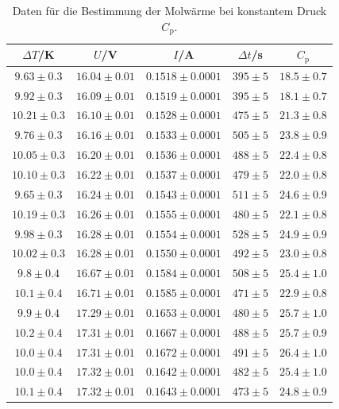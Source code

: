 \begin{table}
  \centering
  \caption{Daten für die Bestimmung der Molwärme bei konstantem Druck $C_\mathrm{p}$.}
  \label{tab:tab1}
  \begin{tabular}{c c c c c}
    \toprule
		$\Delta T$/K & $U$/V & $I$/A & $\Delta t$/s & $C_\mathrm{p}$ \\
    \midrule
    $9.63\pm0.3$ & $16.04\pm0.01$ & $0.1518\pm0.0001$ & $395\pm5$ & $18.5\pm0.7$ \\
    $9.92\pm0.3$ & $16.09\pm0.01$ & $0.1519\pm0.0001$ & $395\pm5$ & $18.1\pm0.7$ \\
    $10.21\pm0.3$ & $16.10\pm0.01$ & $0.1528\pm0.0001$ & $475\pm5$ & $21.3\pm0.8$ \\
    $9.76\pm0.3$ & $16.16\pm0.01$ & $0.1533\pm0.0001$ & $505\pm5$ & $23.8\pm0.9$ \\
    $10.05\pm0.3$ & $16.20\pm0.01$ & $0.1536\pm0.0001$ & $488\pm5$ & $22.4\pm0.8$ \\
    $10.10\pm0.3$ & $16.22\pm0.01$ & $0.1537\pm0.0001$ & $479\pm5$ & $22.0\pm0.8$ \\
    $9.65\pm0.3$ & $16.24\pm0.01$ & $0.1543\pm0.0001$ & $511\pm5$ & $24.6\pm0.9$ \\
    $10.19\pm0.3$ & $16.26\pm0.01$ & $0.1555\pm0.0001$ & $480\pm5$ & $22.1\pm0.8$ \\
    $9.98\pm0.3$ & $16.28\pm0.01$ & $0.1554\pm0.0001$ & $528\pm5$ & $24.9\pm0.9$ \\
    $10.02\pm0.3$ & $16.28\pm0.01$ & $0.1550\pm0.0001$ & $492\pm5$ & $23.0\pm0.8$ \\
    $9.8\pm0.4$ & $16.67\pm0.01$ & $0.1584\pm0.0001$ & $508\pm5$ & $25.4\pm1.0$ \\
    $10.1\pm0.4$ & $16.71\pm0.01$ & $0.1585\pm0.0001$ & $471\pm5$ & $22.9\pm0.8$ \\
    $9.9\pm0.4$ & $17.29\pm0.01$ & $0.1653\pm0.0001$ & $480\pm5$ & $25.7\pm1.0$ \\
    $10.2\pm0.4$ & $17.31\pm0.01$ & $0.1667\pm0.0001$ & $488\pm5$ & $25.7\pm0.9$ \\
    $10.0\pm0.4$ & $17.31\pm0.01$ & $0.1672\pm0.0001$ & $491\pm5$ & $26.4\pm1.0$ \\
    $10.0\pm0.4$ & $17.32\pm0.01$ & $0.1642\pm0.0001$ & $482\pm5$ & $25.4\pm1.0$ \\
    $10.1\pm0.4$ & $17.32\pm0.01$ & $0.1643\pm0.0001$ & $473\pm5$ & $24.8\pm0.9$ \\
    \bottomrule
  \end{tabular}
\end{table}
